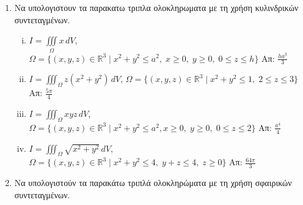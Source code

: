 


\pagestyle{askhseis}
\everymath{\displaystyle}



\begin{center}
  \minibox[c]{\large\bf \textcolor{Col1}{Ασκήσεις Τριπλό Ολοκλήρωμα} \\ 
\textcolor{Col1}{(Αλλαγη μεταβλητων)}}
\end{center}

\vspace{\baselineskip}

\begin{enumerate}
  \item Να υπολογιστουν τα παρακατω τριπλα ολοκληρωματα με τη χρήση 
    κυλινδρικών συντεταγμένων.

    \begin{enumerate}[i)]
      \item $ I=\iiint\limits_{\Omega} x\,dV $, \quad $ \Omega = 
        \{(x,y,z)\in \mathbb{R}^{3} \mid x^{2}+y^{2} \leq a^{2},\; x 
        \geq 0,\; y \geq 0,\; 0 \leq z \leq h \}  $ 
        \hfill Απ: $ \frac{ha^{3}}{3} $  
      \item $ I=\iiint_{\Omega} z(x^{2}+y^{2})\,dV $, \quad $ \Omega = \{(x,y,z)\in
        \mathbb{R}^{3} \mid x^{2}+y^{2} \leq 1,\; 2 \leq z \leq 3 \} $ 
        \hfill Απ: $ \frac{5 \pi }{4} $ 
      \item $ I=\iiint_{\Omega}xyz\,dV $, \quad $ \Omega = \{(x,y,z)\in \mathbb{R}^{3} 
        \mid x^{2}+y^{2} \leq a^{2}, x \geq 0,\; y \geq 0,\; 0 \leq z \leq 2 \} $ 
        \hfill Απ: $ \frac{a^{4}}{4} $ 
      \item $ I=\iiint_{\Omega} \sqrt{ x^{2}+y^{2} }\, dV $, \quad $ \Omega = 
        \{(x,y,z)\in \mathbb{R}^{3} \mid x^{2}+y^{2} \leq 4,\; y+z \leq 4,\; z \geq 0\}$ 
        \hfill Απ: $ \frac{64 \pi}{3} $ 
    \end{enumerate}

  \item Να υπολογιστούν τα παρακάτω τριπλά ολοκληρώματα με τη χρήση 
    σφαιρικών συντεταγμένων.


\end{enumerate}
